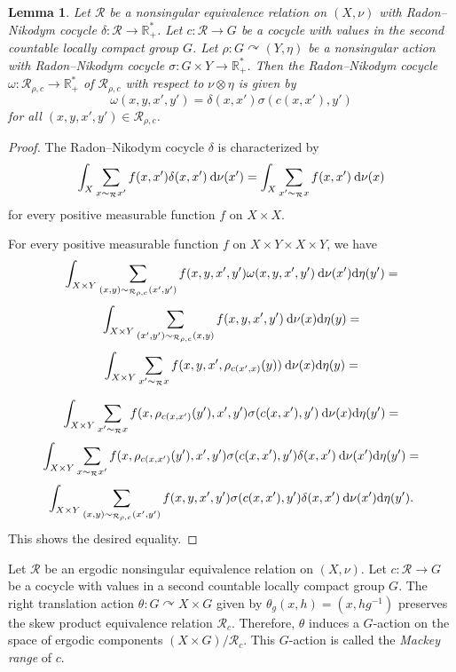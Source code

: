 \documentclass[a4paper,11pt]{amsart}
\numberwithin{equation}{section}
\newtheorem{lemma}[theorem]{Lemma}
\theoremstyle{definition}
\newcommand{\R}{\mathbb{R}}
\newcommand{\rd}{\text{\rm d}}
\newcommand{\cR}{\mathcal{R}}
\begin{document}
\begin{lemma} \label{Radon--Nikodym induced equivalence relation}
    Let $\cR$ be a nonsingular equivalence relation on $(X,\nu)$ with Radon--Nikodym cocycle $\delta : \cR \rightarrow \R^*_+$. Let $c : \cR \rightarrow G$ be a cocycle with values in the second countable locally compact group $G$. Let $\rho : G \curvearrowright (Y,\eta)$ be a nonsingular action with Radon--Nikodym cocycle $\sigma : G \times Y \rightarrow \R^*_+$. Then the Radon--Nikodym cocycle $\omega : \cR_{\rho,c} \rightarrow \R^*_+$ of $\cR_{\rho,c}$ with respect to $\nu \otimes \eta$ is given by
    $$ \omega(x,y,x',y')=\delta(x,x') \sigma(c(x,x'),y')$$
    for all $(x,y,x',y') \in \cR_{\rho,c}$.
\end{lemma}
\begin{proof}
    The Radon--Nikodym cocycle $\delta$ is characterized by
    $$ \int_X \sum_{x \sim_{\cR} x'} f(x,x') \delta(x,x') \: \rd \nu(x') = \int_X \sum_{x' \sim_{\cR} x} f(x,x') \: \rd \nu(x)$$
    for every positive measurable function $f$ on $X \times X$.

    For every positive measurable function $f$ on $X \times Y \times X \times Y$, we have 
    $$ \int_{X \times Y} \sum_{(x,y) \sim_{\cR_{\rho,c}} (x',y')} f(x,y,x',y') \omega(x,y,x',y') \: \rd \nu(x') \rd \eta(y') =$$
    $$\int_{X\times Y} \sum_{(x',y') \sim_{\cR_{\rho,c}} (x,y)} f(x,y,x',y') \: \rd \nu(x) \rd \eta(y)=$$
    $$\int_{X\times Y} \sum_{x' \sim_\cR x} f(x,y,x',\rho_{c(x',x)}(y)) \: \rd \nu(x) \rd \eta(y)=$$

    $$\int_{X\times Y} \sum_{x' \sim_\cR x} f(x,\rho_{c(x,x')}(y'),x',y') \sigma(c(x,x'),y') \: \rd \nu(x) \rd \eta(y')=$$
    $$\int_{X\times Y} \sum_{x \sim_\cR x'} f(x,\rho_{c(x,x')}(y'),x',y') \sigma(c(x,x'),y') \delta(x,x') \: \rd \nu(x') \rd \eta(y')=$$
    $$\int_{X\times Y} \sum_{(x,y) \sim_{\cR_{\rho,c}} (x',y')} f(x,y,x',y') \sigma(c(x,x'),y') \delta(x,x') \: \rd \nu(x') \rd \eta(y').$$
    This shows the desired equality.
\end{proof}



Let $\cR$ be an ergodic nonsingular equivalence relation on $(X,\nu)$. Let $c : \cR \rightarrow G$ be a cocycle with values in a second countable locally compact group $G$. The right translation action $\theta : G \curvearrowright X \times G$ given by $\theta_g(x,h)=(x,hg^{-1})$ preserves the skew product equivalence relation $\cR_{c}$. Therefore, $\theta$ induces a $G$-action on the space of ergodic components $(X \times G)/{\cR_c}$. This $G$-action is called the \emph{Mackey range} of $c$.
\end{document}
